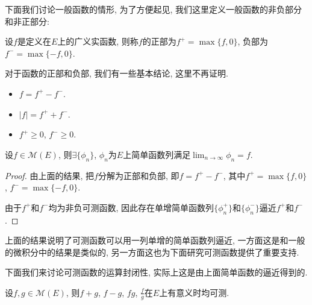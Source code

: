 \documentclass[theorem=false,mathfont=none,openany,sub3section]{easybook}
\begin{document}
下面我们讨论一般函数的情形, 为了方便起见, 我们这里定义一般函数的非负部分和非正部分:\par

\begin{definition}
  设$f$是定义在$E$上的广义实函数, 则称$f$的正部为$f^+=\max\{f,0\}$, 负部为$f^-=\max\{-f,0\}$.\par
\end{definition}

\begin{remark}
  对于函数的正部和负部, 我们有一些基本结论, 这里不再证明.\par
  \begin{itemize}
    \item $f=f^+-f^-$.
    \item $|f|=f^++f^-$.
    \item $f^+\geqslant 0$, $f^-\geqslant 0$.
  \end{itemize}
\end{remark}

\begin{corollary}
  设$f\in \mathcal{M}(E)$, 则$\exists \{\phi_n\}$, $\phi_n$为$E$上简单函数列满足$\lim_{n \to \infty} \phi_n = f$.\par
\end{corollary}

\begin{proof}
  由上面的结果, 把$f$分解为正部和负部, 即$f=f^+-f^-$, 其中$f^+=\max\{f,0\}$, $f^-=\max\{-f,0\}$.\par
  由于$f^+$和$f^-$均为非负可测函数, 因此存在单增简单函数列$\{\phi_n^{+}\}$和$\{\phi_n^{-}\}$逼近$f^+$和$f^-$.\par
\end{proof}

\begin{remark}
  上面的结果说明了可测函数可以用一列单增的简单函数列逼近, 一方面这是和一般的微积分中的结果是类似的, 另一方面这也为下面研究可测函数提供了重要支持.\par
\end{remark}

下面我们来讨论可测函数的运算封闭性, 实际上这是由上面简单函数的逼近得到的.\par

\begin{theorem}
  设$f,g\in \mathcal{M}(E)$, 则$f+g$, $f-g$, $fg$, $\frac{f}{g}$在$E$上有意义时均可测.\par
\end{theorem}
\end{document}
